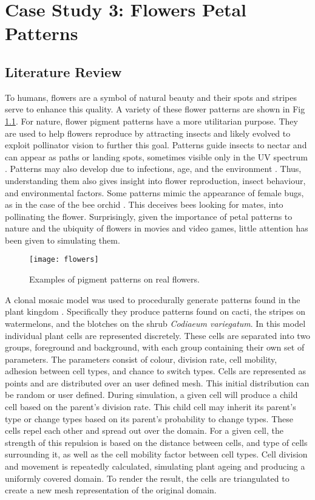 \chapter{Case Study 3: Flowers Petal Patterns}

\section{Literature Review}
To humans, flowers are a symbol of natural beauty and their spots and stripes serve to enhance this quality. A variety of these flower patterns are shown in Fig \ref{fig:realFlowers}. For nature, flower pigment patterns have a more  utilitarian purpose. They are used to help flowers reproduce by attracting insects and likely evolved to exploit pollinator vision to further this goal. Patterns guide insects to nectar and can appear as paths or landing spots, sometimes visible only in the UV spectrum \cite{Davies2012}. Patterns may also develop due to infections, age, and the environment \cite{Davies2012} \cite{ROBINSON2015}. Thus, understanding them also gives insight into flower reproduction, insect behaviour, and environmental factors. Some patterns mimic the appearance of female bugs, as in the case of the bee orchid \cite{Vereecken7484}. This deceives bees looking for mates, into pollinating the flower. Surprisingly, given the importance of petal patterns to nature and the ubiquity of flowers in movies and video games, little attention has been given to simulating them. 

\clearpage
\begin{figure}[!ht]
	\centering
	\texttt{[image: flowers]}
	\caption{Examples of pigment patterns on real flowers.}
	\label{fig:realFlowers}
\end{figure}
A clonal mosaic model was used to procedurally generate patterns found in the plant kingdom \cite{binsfeld2011}. Specifically they produce patterns found on cacti, the stripes on watermelons, and the blotches on the shrub \textit{Codiaeum variegatum}. In this model individual plant cells are represented discretely. These cells are separated into two groups, foreground and background, with each group containing their own set of parameters. The parameters consist of colour, division rate, cell mobility, adhesion between cell types, and chance to switch types. Cells are represented as points and are distributed over an user defined mesh. This initial distribution can be random or user defined. During simulation, a given cell will produce a child cell based on the parent's division rate. This child cell may inherit its parent's type or change types based on its parent's probability to change types. These cells repel each other and spread out over the domain. For a given cell, the strength of this repulsion is based on the distance between cells, and type of cells surrounding it, as well as the cell mobility factor between cell types. Cell division and movement is repeatedly calculated, simulating plant ageing and producing a uniformly covered domain. To render the result, the cells are triangulated to create a new mesh representation of the original domain.

